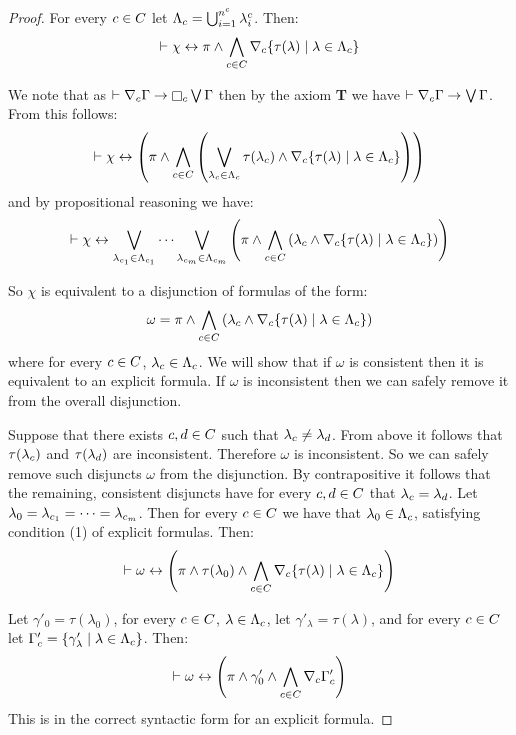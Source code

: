 \begin{proof}
For every $c \in C$ let $\Lambda_c = \bigcup_{i = 1}^{n^c} \lambda^c_i$.
Then:
$$
\vdash \chi \leftrightarrow \pi \land \bigwedge_{c \in C} \nabla_{c} \{\tau(\lambda) \mid \lambda \in \Lambda_c\}
$$

We note that as $\proves \coversC \Gamma \implies \necessaryC \bigvee \Gamma$ then by the \axiomS{} axiom {\bf T} we have $\vdash \nabla_{c} \Gamma \rightarrow \bigvee \Gamma$.
From this follows:
$$
\vdash \chi \leftrightarrow \left( \pi \land \bigwedge_{c \in C} \left(\bigvee_{\lambda_c \in \Lambda_c} \tau(\lambda_c) \land \nabla_{c} \{\tau(\lambda) \mid \lambda \in \Lambda_c\}\right) \right)
$$
and by propositional reasoning we have:
$$
\vdash \chi \leftrightarrow \bigvee_{\lambda_{c_1} \in \Lambda_{c_1}} \cdots \bigvee_{\lambda_{c_m} \in \Lambda_{c_m}} \left(\pi \land \bigwedge_{c \in C} \left(\lambda_c \land \nabla_{c} \{\tau(\lambda) \mid \lambda \in \Lambda_c\} \right) \right)
$$

So $\chi$ is equivalent to a disjunction of formulas of the form:
$$\omega = \pi \land \bigwedge_{c \in C} \left(\lambda_c \land \nabla_{c} \{\tau(\lambda) \mid \lambda \in \Lambda_c\} \right)$$
where for every $c \in C$, $\lambda_c \in \Lambda_c$.
We will show that if $\omega$ is consistent then it is equivalent to an explicit formula.
If $\omega$ is inconsistent then we can safely remove it from the overall disjunction.

Suppose that there exists $c, d \in C$ such that $\lambda_c \neq \lambda_d$.
From above it follows that $\tau(\lambda_c)$ and $\tau(\lambda_d)$ are inconsistent.
Therefore $\omega$ is inconsistent.
So we can safely remove such disjuncts $\omega$ from the disjunction.
By contrapositive it follows that the remaining, consistent disjuncts have for every $c, d \in C$ that $\lambda_c = \lambda_d$.
Let $\lambda_0 = \lambda_{c_1} = \cdots = \lambda_{c_m}$.
Then for every $c \in C$ we have that $\lambda_0 \in \Lambda_c$, satisfying condition (1) of explicit formulas.
Then:
$$
\vdash \omega \leftrightarrow \left( \pi \land \tau(\lambda_0) \land \bigwedge_{c \in C} \nabla_{c} \{\tau(\lambda) \mid \lambda \in \Lambda_c\} \right)
$$

Let $\gamma'_0 = \tau(\lambda_0)$, for every $c \in C$, $\lambda \in \Lambda_c$, let $\gamma'_\lambda = \tau(\lambda)$, and for every $c \in C$ let $\Gamma'_c = \{\gamma'_\lambda \mid \lambda \in \Lambda_c\}$.
Then:
$$
\vdash \omega \leftrightarrow \left( \pi \land \gamma'_0 \land \bigwedge_{c \in C} \nabla_{c} \Gamma'_c \right)
$$
This is in the correct syntactic form for an explicit formula.


\end{proof}
